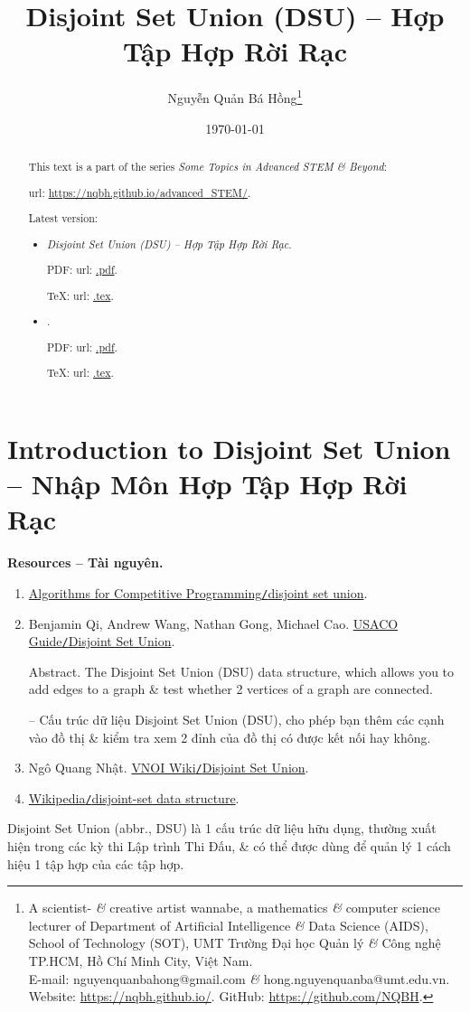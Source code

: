 \documentclass{article}
\title{Disjoint Set Union (DSU) -- Hợp Tập Hợp Rời Rạc}
\author{Nguyễn Quản Bá Hồng\footnote{A scientist- {\it\&} creative artist wannabe, a mathematics {\it\&} computer science lecturer of Department of Artificial Intelligence {\it\&} Data Science (AIDS), School of Technology (SOT), UMT Trường Đại học Quản lý {\it\&} Công nghệ TP.HCM, Hồ Chí Minh City, Việt Nam.\\E-mail: {\sf nguyenquanbahong@gmail.com} {\it\&} {\sf hong.nguyenquanba@umt.edu.vn}. Website: \url{https://nqbh.github.io/}. GitHub: \url{https://github.com/NQBH}.}}
\date{\today}
\begin{document}
\maketitle
\begin{abstract}
    This text is a part of the series {\it Some Topics in Advanced STEM \& Beyond}:

    {\sc url}: \url{https://nqbh.github.io/advanced_STEM/}.

    Latest version:
    \begin{itemize}
        \item {\it Disjoint Set Union (DSU) -- Hợp Tập Hợp Rời Rạc}.

        PDF: {\sc url}: \url{.pdf}.

        \TeX: {\sc url}: \url{.tex}.
        \item {\it }.

        PDF: {\sc url}: \url{.pdf}.

        \TeX: {\sc url}: \url{.tex}.
    \end{itemize}
\end{abstract}
\tableofcontents


\section{Introduction to Disjoint Set Union -- Nhập Môn Hợp Tập Hợp Rời Rạc}
\textbf{\textsf{Resources -- Tài nguyên.}}
\begin{enumerate}
    \item \href{https://cp-algorithms.com/data_structures/disjoint_set_union.html}{Algorithms for Competitive Programming{\tt/}disjoint set union}.

    \item {\sc Benjamin Qi, Andrew Wang, Nathan Gong, Michael Cao}. \href{https://usaco.guide/gold/dsu?lang=cpp}{USACO Guide{\tt/}Disjoint Set Union}.

    {\sf Abstract.} The Disjoint Set Union (DSU) data structure, which allows you to add edges to a graph \& test whether 2 vertices of a graph are connected.

    -- Cấu trúc dữ liệu Disjoint Set Union (DSU), cho phép bạn thêm các cạnh vào đồ thị \& kiểm tra xem 2 đỉnh của đồ thị có được kết nối hay không.

    \item {\sc Ngô Quang Nhật}. \href{https://wiki.vnoi.info/algo/data-structures/disjoint-set-union}{VNOI Wiki{\tt/}Disjoint Set Union}.

    \item \href{https://en.wikipedia.org/wiki/Disjoint-set_data_structure}{Wikipedia{\tt/}disjoint-set data structure}.
\end{enumerate}
Disjoint Set Union (abbr., DSU) là 1 cấu trúc dữ liệu hữu dụng, thường xuất hiện trong các kỳ thi Lập trình Thi Đấu, \& có thể được dùng để quản lý 1 cách hiệu 1 tập hợp của các tập hợp.
\end{document}

